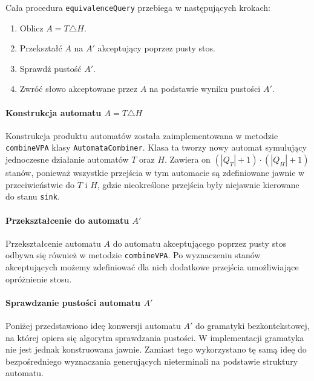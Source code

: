 Cała procedura \texttt{equivalenceQuery} przebiega w następujących krokach:
\begin{enumerate}
    \item Oblicz $A = T \triangle H$.
    \item Przekształć $A$ na $A'$ akceptujący poprzez pusty stos.
    \item Sprawdź pustość $A'$.
    \item Zwróć słowo akceptowane przez $A$ na podstawie wyniku pustości $A'$.
\end{enumerate}

\paragraph{Konstrukcja automatu $A = T \triangle H$}
Konstrukcja produktu automatów została zaimplementowana w metodzie \texttt{combineVPA} klasy \texttt{AutomataCombiner}. Klasa ta tworzy nowy automat
symulujący jednoczesne działanie automatów $T$ oraz $H$. Zawiera on $(|Q_{T}| + 1) \cdot (|Q_{H}| + 1)$ stanów, ponieważ wszystkie przejścia
w tym automacie są zdefiniowane jawnie w przeciwieństwie do $T$ i $H$, gdzie nieokreślone przejścia były niejawnie kierowane do stanu \texttt{sink}.

\paragraph{Przekształcenie do automatu $A'$}
Przekształcenie automatu $A$ do automatu akceptującego poprzez pusty stos odbywa się również w metodzie \texttt{combineVPA}.
Po wyznaczeniu stanów akceptujących możemy zdefiniować dla nich dodatkowe przejścia umożliwiające opróżnienie stosu.

\paragraph{Sprawdzanie pustości automatu $A'$}
Poniżej przedstawiono ideę konwersji automatu $A'$ do gramatyki bezkontekstowej, na której opiera się algorytm
sprawdzania pustości. W implementacji gramatyka nie jest jednak konstruowana jawnie. Zamiast tego wykorzystano
tę samą ideę do bezpośredniego wyznaczania generujących nieterminali na podstawie struktury automatu.

